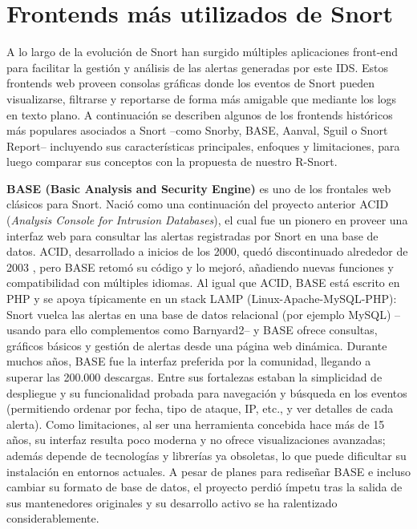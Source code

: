 \documentclass[11pt,a4paper,twoside]{report}
\begin{document}
\section{Frontends más utilizados de Snort}

A lo largo de la evolución de Snort han surgido múltiples aplicaciones front-end para facilitar la gestión y análisis de las alertas generadas por este IDS. Estos frontends web proveen consolas gráficas donde los eventos de Snort pueden visualizarse, filtrarse y reportarse de forma más amigable que mediante los logs en texto plano. A continuación se describen algunos de los frontends históricos más populares asociados a Snort –como Snorby, BASE, Aanval, Sguil o Snort Report– incluyendo sus características principales, enfoques y limitaciones, para luego comparar sus conceptos con la propuesta de nuestro R-Snort.\newline

\textbf{BASE (Basic Analysis and Security Engine)} es uno de los frontales web clásicos para Snort. Nació como una continuación del proyecto anterior ACID (\textit{Analysis Console for Intrusion Databases}), el cual fue un pionero en proveer una interfaz web para consultar las alertas registradas por Snort en una base de datos. ACID, desarrollado a inicios de los 2000, quedó discontinuado alrededor de 2003 \cite{SnorbyHelpnet2010}, pero BASE retomó su código y lo mejoró, añadiendo nuevas funciones y compatibilidad con múltiples idiomas. Al igual que ACID, BASE está escrito en PHP y se apoya típicamente en un stack LAMP (Linux-Apache-MySQL-PHP): Snort vuelca las alertas en una base de datos relacional (por ejemplo MySQL) –usando para ello complementos como Barnyard2– y BASE ofrece consultas, gráficos básicos y gestión de alertas desde una página web dinámica. Durante muchos años, BASE fue la interfaz preferida por la comunidad, llegando a superar las 200.000 descargas. Entre sus fortalezas estaban la simplicidad de despliegue y su funcionalidad probada para navegación y búsqueda en los eventos (permitiendo ordenar por fecha, tipo de ataque, IP, etc., y ver detalles de cada alerta). Como limitaciones, al ser una herramienta concebida hace más de 15 años, su interfaz resulta poco moderna y no ofrece visualizaciones avanzadas; además depende de tecnologías y librerías ya obsoletas, lo que puede dificultar su instalación en entornos actuales. A pesar de planes para rediseñar BASE e incluso cambiar su formato de base de datos, el proyecto perdió ímpetu tras la salida de sus mantenedores originales y su desarrollo activo se ha ralentizado considerablemente.\newline
\end{document}
